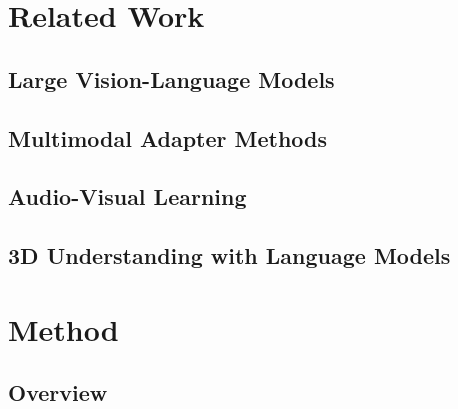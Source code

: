 \documentclass[runningheads]{llncs}
\newcommand{\safe}{\textsc{Safe}}
\begin{document}
\section{Related Work}
\label{sec:related}


\subsection{Large Vision-Language Models}

\subsection{Multimodal Adapter Methods}

\subsection{Audio-Visual Learning}

\subsection{3D Understanding with Language Models}

\section{Method}
\label{sec:method}


\subsection{Overview}
\label{sec:method-overview}

\end{document}
